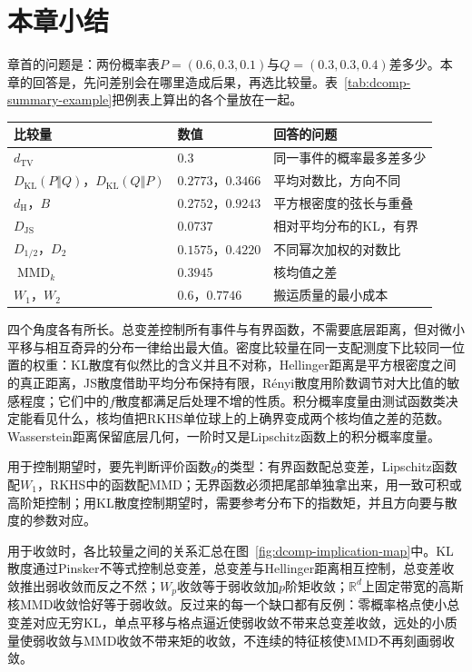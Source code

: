 \section{本章小结}
\label{sec:dcomp-summary}

章首的问题是：两份概率表$P=(0.6,0.3,0.1)$与$Q=(0.3,0.3,0.4)$差多少。本章的回答是，先问差别会在哪里造成后果，再选比较量。表~\ref{tab:dcomp-summary-example}把例表上算出的各个量放在一起。

\begin{BookInlineTable}
 \centering
 \caption{例表上的各比较量（自然对数；MMD用$\sigma=1$的高斯核）。}
 \label{tab:dcomp-summary-example}
 \begin{tabular}{lll}
  \toprule
  比较量 & 数值 & 回答的问题\\
  \midrule
  $d_{\mathrm{TV}}$ & $0.3$ & 同一事件的概率最多差多少\\
  $D_{\mathrm{KL}}(P\Vert Q)$，$D_{\mathrm{KL}}(Q\Vert P)$ & $0.2773$，$0.3466$ & 平均对数比，方向不同\\
  $d_{\mathrm{H}}$，$B$ & $0.2752$，$0.9243$ & 平方根密度的弦长与重叠\\
  $D_{\mathrm{JS}}$ & $0.0737$ & 相对平均分布的KL，有界\\
  $D_{1/2}$，$D_{2}$ & $0.1575$，$0.4220$ & 不同幂次加权的对数比\\
  $\operatorname{MMD}_k$ & $0.3945$ & 核均值之差\\
  $W_1$，$W_2$ & $0.6$，$0.7746$ & 搬运质量的最小成本\\
  \bottomrule
 \end{tabular}
\end{BookInlineTable}

四个角度各有所长。总变差控制所有事件与有界函数，不需要底层距离，但对微小平移与相互奇异的分布一律给出最大值。密度比较量在同一支配测度下比较同一位置的权重：KL散度有似然比的含义并且不对称，Hellinger距离是平方根密度之间的真正距离，JS散度借助平均分布保持有限，Rényi散度用阶数调节对大比值的敏感程度；它们中的$f$散度都满足后处理不增的性质。积分概率度量由测试函数类决定能看见什么，核均值把RKHS单位球上的上确界变成两个核均值之差的范数。Wasserstein距离保留底层几何，一阶时又是Lipschitz函数上的积分概率度量。

用于控制期望时，要先判断评价函数$g$的类型：有界函数配总变差，Lipschitz函数配$W_1$，RKHS中的函数配MMD；无界函数必须把尾部单独拿出来，用一致可积或高阶矩控制；用KL散度控制期望时，需要参考分布下的指数矩，并且方向要与散度的参数对应。

用于收敛时，各比较量之间的关系汇总在图~\ref{fig:dcomp-implication-map}中。KL散度通过Pinsker不等式控制总变差，总变差与Hellinger距离相互控制，总变差收敛推出弱收敛而反之不然；$W_p$收敛等于弱收敛加$p$阶矩收敛；$\mathbb{R}^{d}$上固定带宽的高斯核MMD收敛恰好等于弱收敛。反过来的每一个缺口都有反例：零概率格点使小总变差对应无穷KL，单点平移与格点逼近使弱收敛不带来总变差收敛，远处的小质量使弱收敛与MMD收敛不带来矩的收敛，不连续的特征核使MMD不再刻画弱收敛。

